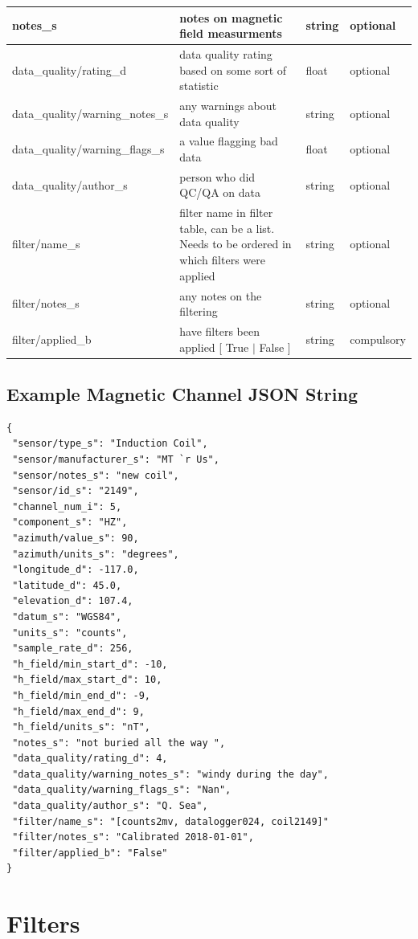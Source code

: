 \documentclass{article}
\begin{document}
\begin{table}[htb!]
\begin{tabular}{|l|p{3in}|l|l|}
		notes\_s & notes on magnetic field measurments & string &  optional \\ \hline
		data\_quality/rating\_d & data quality rating based on some sort of statistic & float &  optional \\ \hline
		data\_quality/warning\_notes\_s & any warnings about data quality & string &   optional \\ \hline
		data\_quality/warning\_flags\_s & a value flagging bad data  & float &  optional \\ \hline
		data\_quality/author\_s & person who did QC/QA on data & string &   optional \\ \hline
		filter/name\_s & filter name in filter table, can be a list. Needs to be ordered in which filters were applied & string &  optional \\ \hline
		filter/notes\_s & any notes on the filtering & string &  optional \\ \hline
		filter/applied\_b & have filters been applied [ True $|$ False ] & string & compulsory \\ \hline
		\end{tabular}
	\label{tab:magnetic}
\end{table}

\newpage
\subsection{Example Magnetic Channel JSON String}

\begin{verbatim}
{
 "sensor/type_s": "Induction Coil",
 "sensor/manufacturer_s": "MT `r Us",
 "sensor/notes_s": "new coil",
 "sensor/id_s": "2149",
 "channel_num_i": 5,
 "component_s": "HZ",
 "azimuth/value_s": 90,
 "azimuth/units_s": "degrees",
 "longitude_d": -117.0,
 "latitude_d": 45.0,
 "elevation_d": 107.4,
 "datum_s": "WGS84",
 "units_s": "counts",
 "sample_rate_d": 256,
 "h_field/min_start_d": -10,
 "h_field/max_start_d": 10,
 "h_field/min_end_d": -9,
 "h_field/max_end_d": 9,
 "h_field/units_s": "nT",
 "notes_s": "not buried all the way ",
 "data_quality/rating_d": 4,
 "data_quality/warning_notes_s": "windy during the day",
 "data_quality/warning_flags_s": "Nan",
 "data_quality/author_s": "Q. Sea",
 "filter/name_s": "[counts2mv, datalogger024, coil2149]"
 "filter/notes_s": "Calibrated 2018-01-01",
 "filter/applied_b": "False"
}
\end{verbatim}

\newpage
\section{Filters}
\end{document}
